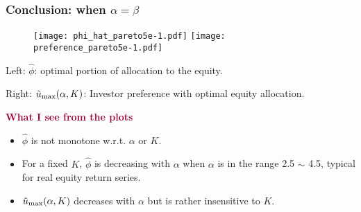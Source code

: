 \documentclass{beamer}
\begin{document}
\begin{frame}
  \frametitle{Conclusion: when $\alpha = \beta$}
  \begin{minipage}[t]{0.6\linewidth}
    \begin{figure}[htb!]
        \texttt{[image: phi\_hat\_pareto5e-1.pdf]}    
        \texttt{[image: preference\_pareto5e-1.pdf]}
    \end{figure}
    \begin{scriptsize}
    Left: $\hat \phi$: optimal portion of allocation to the equity.

    Right: $\tilde u_{\rm max}(\alpha, K)$: Investor preference  with
    optimal equity allocation.
    \end{scriptsize}
  \end{minipage}\hfill
  \begin{minipage}[t]{0.4\linewidth}
    \begin{scriptsize}
      \textcolor[HTML]{990033}{\bf What I see from the plots}
    \begin{itemize}
    \item $\hat \phi$ is not monotone w.r.t. $\alpha$ or $K$.
    \item For a fixed $K$, $\hat \phi$ is decreasing with $\alpha$
      when $\alpha$ is in the range 2.5 $\sim$ 4.5, typical for real
      equity return series.
      \item $\tilde u_{\rm max}(\alpha, K)$ decreases with $\alpha$ 
        but is rather insensitive to $K$.
    \end{itemize}
    \end{scriptsize}
    \end{minipage}
\end{frame}
\end{document}
